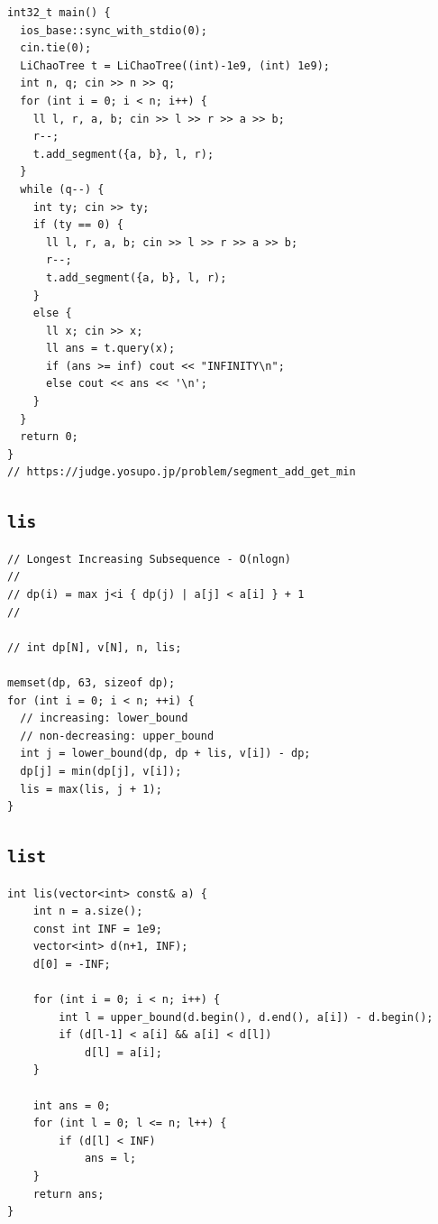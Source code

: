 \begin{lstlisting}
int32_t main() {
  ios_base::sync_with_stdio(0);
  cin.tie(0);
  LiChaoTree t = LiChaoTree((int)-1e9, (int) 1e9);
  int n, q; cin >> n >> q;
  for (int i = 0; i < n; i++) {
    ll l, r, a, b; cin >> l >> r >> a >> b;
    r--;
    t.add_segment({a, b}, l, r);
  }
  while (q--) {
    int ty; cin >> ty;
    if (ty == 0) {
      ll l, r, a, b; cin >> l >> r >> a >> b;
      r--;
      t.add_segment({a, b}, l, r);
    }
    else {
      ll x; cin >> x;
      ll ans = t.query(x);
      if (ans >= inf) cout << "INFINITY\n";
      else cout << ans << '\n';
    }
  }
  return 0;
}
// https://judge.yosupo.jp/problem/segment_add_get_min\end{lstlisting}

\subsection{\texttt{lis}}
\begin{lstlisting}
// Longest Increasing Subsequence - O(nlogn)
//
// dp(i) = max j<i { dp(j) | a[j] < a[i] } + 1
//

// int dp[N], v[N], n, lis;

memset(dp, 63, sizeof dp);
for (int i = 0; i < n; ++i) {
  // increasing: lower_bound
  // non-decreasing: upper_bound
  int j = lower_bound(dp, dp + lis, v[i]) - dp;
  dp[j] = min(dp[j], v[i]);
  lis = max(lis, j + 1);
}\end{lstlisting}

\subsection{\texttt{list}}
\begin{lstlisting}
int lis(vector<int> const& a) {
    int n = a.size();
    const int INF = 1e9;
    vector<int> d(n+1, INF);
    d[0] = -INF;

    for (int i = 0; i < n; i++) {
        int l = upper_bound(d.begin(), d.end(), a[i]) - d.begin();
        if (d[l-1] < a[i] && a[i] < d[l])
            d[l] = a[i];
    }

    int ans = 0;
    for (int l = 0; l <= n; l++) {
        if (d[l] < INF)
            ans = l;
    }
    return ans;
}\end{lstlisting}

